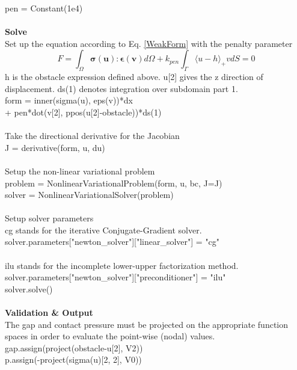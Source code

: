 \documentclass[12pt,3p]{article}
\begin{document}
{\selectfont
pen = Constant(1e4) \\ \\
}
\textbf{Solve} \\
Set up the equation according to Eq. \ref{WeakForm} with the penalty parameter \\
\begin{equation*}
F = \int_{\Omega} \mathbf{ \sigma(u) : \epsilon(v) } d \Omega + k_{pen} \int_{\Gamma} \langle u - h \rangle_{+} v dS  = 0 
\end{equation*}
h is the obstacle expression defined above. u[2] gives the z direction of displacement. ds(1) denotes integration over subdomain part 1. \\
{\selectfont
form = inner(sigma(u), eps(v))*dx \\
\indent \indent \indent \indent \indent + pen*dot(v[2], ppos(u[2]-obstacle))*ds(1) \\ \\
}
Take the directional derivative for the Jacobian \\ 
{\selectfont
J = derivative(form, u, du) \\ \\ 
}
Setup the non-linear variational problem \\
{\selectfont
problem = NonlinearVariationalProblem(form, u, bc, J=J) \\ 
solver = NonlinearVariationalSolver(problem) \\ \\
}
Setup solver parameters \\
{\selectfont cg} stands for the iterative Conjugate-Gradient solver. \\
{\selectfont
solver.parameters["newton\_solver"]["linear\_solver"] = "cg" \\ \\
}
{\selectfont ilu} stands for the incomplete lower-upper factorization method. \\ 
{\selectfont
solver.parameters["newton\_solver"]["preconditioner"] = "ilu" \\
solver.solve() \\ \\
}
\textbf{Validation \& Output} \\
The gap and contact pressure must be projected on the appropriate function spaces in order to evaluate the point-wise (nodal) values. \\
{\selectfont
gap.assign(project(obstacle-u[2], V2)) \\ 
p.assign(-project(sigma(u)[2, 2], V0)) \\ \\
}
\end{document}
